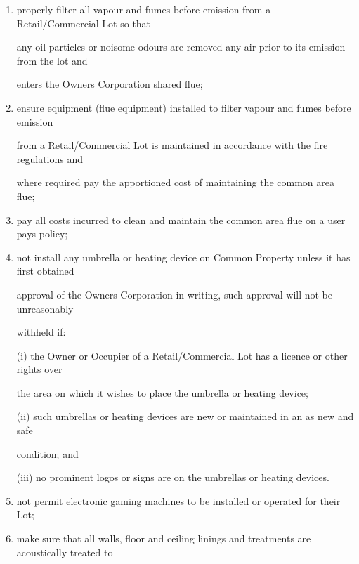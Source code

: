 \documentclass{article}
\begin{document}
\begin{enumerate}[label=\arabic*.]
\begin{enumerate}[label=\arabic{enumi}.\arabic*.]
\begin{enumerate}[label=(\arabic*)]
\begin{enumerate}[label=(\alph*)]
\item {\fontsize{9.962}{1} properly filter all vapour and fumes before emission from a Retail/Commercial Lot so that }

{\fontsize{10.02}{1}any oil particles or noisome odours are removed any air prior to its emission from the lot and }

{\fontsize{10.02}{1}enters the Owners Corporation shared flue; }

\item {\fontsize{9.962}{1} ensure equipment (flue equipment) installed to filter vapour and fumes before emission }

{\fontsize{10.02}{1}from a Retail/Commercial Lot is maintained in accordance with the fire regulations and }

{\fontsize{10.02}{1}where required pay the apportioned cost of maintaining the common area flue; }

\item {\fontsize{9.962}{1} pay all costs incurred to clean and maintain the common area flue on a user pays policy; }

\item {\fontsize{9.962}{1} not install any umbrella or heating device on Common Property unless it has first obtained }

{\fontsize{10.02}{1}approval of the Owners Corporation in writing, such approval will not be unreasonably }

{\fontsize{10.02}{1}withheld if: }

{\fontsize{9.962}{1}(i) the Owner or Occupier of a Retail/Commercial Lot has a licence or other rights over }

{\fontsize{10.02}{1}the area on which it wishes to place the umbrella or heating device; }

{\fontsize{9.962}{1}(ii) such umbrellas or heating devices are new or maintained in an as new and safe }

{\fontsize{10.02}{1}condition; and }

{\fontsize{9.962}{1}(iii) no prominent logos or signs are on the umbrellas or heating devices. }

\item {\fontsize{9.962}{1} not permit electronic gaming machines to be installed or operated for their Lot; }

\item {\fontsize{9.962}{1} make sure that all walls, floor and ceiling linings and treatments are acoustically treated to }


\end{enumerate}
\end{enumerate}
\end{enumerate}
\end{enumerate}
\end{document}
